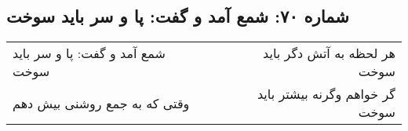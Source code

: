 \begin{center}
\section*{شماره ۷۰: شمع آمد و گفت: پا و سر باید سوخت}
\label{sec:070}
\begin{longtable}{l p{0.5cm} r}
شمع آمد و گفت: پا و سر باید سوخت
&&
هر لحظه به آتش دگر باید سوخت
\\
وقتی که به جمع روشنی بیش دهم
&&
گر خواهم وگرنه بیشتر باید سوخت
\\
\end{longtable}
\end{center}
